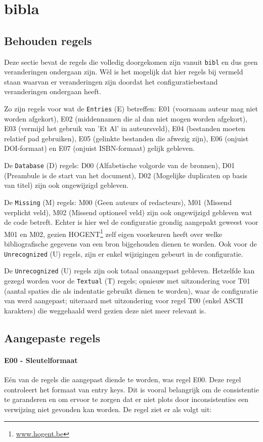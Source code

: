 \section{bibla}
\subsection{Behouden regels}
Deze sectie bevat de regels die volledig doorgekomen zijn vanuit \texttt{bibl} en dus geen veranderingen ondergaan zijn. Wèl is het mogelijk dat hier regels bij vermeld staan waarvan er veranderingen zijn doordat het configuratiebestand veranderingen ondergaan heeft.

Zo zijn regels voor wat de \texttt{Entries} (E) betreffen: E01 (voornaam auteur mag niet worden afgekort), E02 (middennamen die al dan niet mogen worden afgekort), E03 (vermijd het gebruik van 'Et Al' in auteursveld), E04 (bestanden moeten relatief pad gebruiken), E05 (gelinkte bestanden die afwezig zijn), E06 (onjuist DOI-formaat) en E07 (onjuist ISBN-formaat) gelijk gebleven. 

De \texttt{Database} (D) regels: D00 (Alfabetische volgorde van de bronnen), D01 (Preambule is de start van het document), D02 (Mogelijke duplicaten op basis van titel) zijn ook ongewijzigd gebleven.

De \texttt{Missing} (M) regels: M00 (Geen auteurs of redacteurs), M01 (Missend verplicht veld), M02 (Missend optioneel veld) zijn ook ongewijzigd gebleven wat de code betreft. Echter is hier wel de configuratie grondig aangepakt geweest voor M01 en M02, gezien HOGENT\footnote{\url{www.hogent.be}} zelf eigen voorkeuren heeft over welke bibliografische gegevens van een bron bijgehouden dienen te worden. Ook voor de \texttt{Unrecognized} (U) regels, zijn er enkel wijzigingen gebeurt in de configuratie. 

De \texttt{Unrecognized} (U) regels zijn ook totaal onaangepast gebleven. Hetzelfde kan gezegd worden voor de \texttt{Textual} (T) regels; opnieuw met uitzondering voor T01 (aantal spaties die als indentatie gebruikt dienen te worden), waar de configuratie van werd aangepast; uiteraard met uitzondering voor regel T00 (enkel ASCII karakters) die weggehaald werd gezien deze niet meer relevant is.

\subsection{Aangepaste regels}
\paragraph{E00 - Sleutelformaat}
\label{rule:E00}
Eén van de regels die aangepast diende te worden, was regel E00. Deze regel controleert het formaat van entry keys. Dit is vooral belangrijk om de consistentie te garanderen en om ervoor te zorgen dat er niet plots door inconsistenties een verwijzing niet gevonden kan worden. De regel ziet er als volgt uit:

